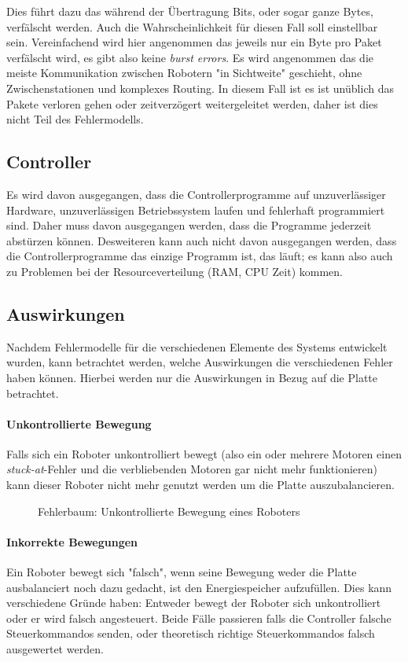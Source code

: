 Dies f{\"{u}}hrt dazu das w{\"{a}}hrend der {\"{U}}bertragung Bits, oder sogar ganze Bytes, verf{\"{a}}lscht werden. Auch die Wahrscheinlichkeit f{\"{u}}r diesen Fall
soll einstellbar sein. Vereinfachend wird hier angenommen das jeweils nur ein Byte pro Paket verf{\"{a}}lscht wird, es gibt also keine \textit{burst errors}.
Es wird angenommen das die meiste Kommunikation zwischen Robotern "in Sichtweite" geschieht, ohne Zwischenstationen und komplexes Routing. In diesem Fall ist
es ist un{\"{u}}blich das Pakete verloren gehen oder zeitverz{\"{o}}gert weitergeleitet werden, daher ist dies nicht Teil des Fehlermodells.

\subsection{Controller}
Es wird davon ausgegangen, dass die Controllerprogramme auf unzuverl{\"{a}}ssiger Hardware, unzuverl{\"{a}}ssigen 
Betriebssystem laufen und fehlerhaft programmiert sind. Daher muss davon ausgegangen werden, dass die
Programme jederzeit abst{\"{u}}rzen k{\"{o}}nnen. Desweiteren kann auch nicht davon ausgegangen werden,
dass die Controllerprogramme das einzige Programm ist, das l{\"{a}}uft; es kann also auch zu Problemen bei
der Resourceverteilung (RAM, CPU Zeit) kommen.

\subsection{Auswirkungen}
Nachdem Fehlermodelle f{\"{u}}r die verschiedenen Elemente des Systems entwickelt wurden, kann
betrachtet werden, welche Auswirkungen die verschiedenen Fehler haben k{\"{o}}nnen. Hierbei werden nur
die Auswirkungen in Bezug auf die Platte betrachtet.

\paragraph{Unkontrollierte Bewegung} Falls sich ein Roboter unkontrolliert bewegt (also ein oder
mehrere Motoren einen \textit{stuck-at}-Fehler und die verbliebenden Motoren gar nicht mehr funktionieren)
kann dieser Roboter nicht mehr genutzt werden um die Platte auszubalancieren.
\begin{figure}
	\centering
	\caption{Fehlerbaum: Unkontrollierte Bewegung eines Roboters}
	\label{fig:fault-tree-robot}
\end{figure}
\clearpage

\paragraph{Inkorrekte Bewegungen} Ein Roboter bewegt sich "falsch", wenn seine Bewegung weder die Platte 
ausbalanciert noch dazu gedacht, ist den Energiespeicher aufzuf{\"{u}}llen. Dies kann verschiedene Gr{\"{u}}nde 
haben: Entweder bewegt der Roboter sich unkontrolliert oder er wird falsch angesteuert. Beide F{\"{a}}lle
passieren falls die Controller falsche Steuerkommandos senden, oder theoretisch richtige Steuerkommandos
falsch ausgewertet werden.

